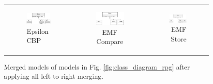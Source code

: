 \begin{figure}
    \begin{tabular}{l|c|r}
        \begin{subfigure}[t]{0.31\linewidth}
            \includegraphics[width=\linewidth]{class_diagram_merged_ecbp}
            \caption{Epsilon CBP}
            \label{fig:class_diagram_merged_ecbp}
        \end{subfigure}
        &
        \begin{subfigure}[t]{0.31\linewidth}
            \includegraphics[width=\linewidth]{class_diagram_merged_emfc}
            \caption{EMF Compare}
            \label{fig:class_diagram_merged_emfc}
        \end{subfigure}
        &
        \begin{subfigure}[t]{0.31\linewidth}
            \includegraphics[width=\linewidth]{class_diagram_merged_emfs}
            \caption{EMF Store}
            \label{fig:class_diagram_merged_emfs}
        \end{subfigure}
    \end{tabular}
    \caption{Merged models of models in Fig. \ref{fig:class_diagram_rpg} after applying all-left-to-right merging.}
    \label{fig:class_diagram_merged}
\end{figure}

